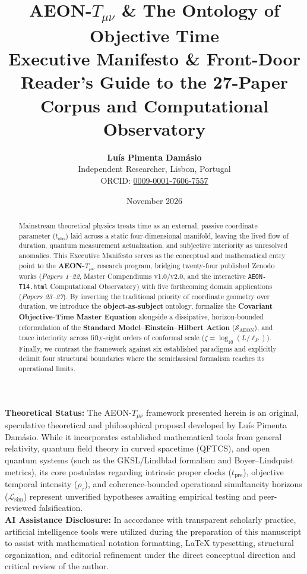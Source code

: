 \documentclass[11pt,a4paper]{article}
\title{\textbf{AEON-$T_{\mu\nu}$ \& The Ontology of Objective Time}\\[0.4em]
\large Executive Manifesto \& Front-Door Reader's Guide to the 27-Paper Corpus and Computational Observatory}
\author{\textbf{Luís Pimenta Damásio}\\
Independent Researcher, Lisbon, Portugal\\
ORCID: \href{https://orcid.org/0009-0001-7606-7557}{0009-0001-7606-7557}}
\date{November 2026}
\begin{document}
\maketitle

\begin{tcolorbox}[colback=gray!6,colframe=gray!50,title=\textbf{Epistemic Status \& AI Collaboration Disclaimer}]
\small
\textbf{Theoretical Status:} The AEON-$T_{\mu\nu}$ framework presented herein is an original, speculative theoretical and philosophical proposal developed by Luís Pimenta Damásio. While it incorporates established mathematical tools from general relativity, quantum field theory in curved spacetime (QFTCS), and open quantum systems (such as the GKSL/Lindblad formalism and Boyer--Lindquist metrics), its core postulates regarding intrinsic proper clocks ($t_{\text{pre}}$), objective temporal intensity ($\rho_\tau$), and coherence-bounded operational simultaneity horizons ($\mathcal{L}_{\text{sim}}$) represent unverified hypotheses awaiting empirical testing and peer-reviewed falsification.\\[0.4em]
\textbf{AI Assistance Disclosure:} In accordance with transparent scholarly practice, artificial intelligence tools were utilized during the preparation of this manuscript to assist with mathematical notation formatting, LaTeX typesetting, structural organization, and editorial refinement under the direct conceptual direction and critical review of the author.
\end{tcolorbox}

\begin{abstract}
\noindent Mainstream theoretical physics treats time as an external, passive coordinate parameter ($t_{\text{obs}}$) laid across a static four-dimensional manifold, leaving the lived flow of duration, quantum measurement actualization, and subjective interiority as unresolved anomalies. This Executive Manifesto serves as the conceptual and mathematical entry point to the \textbf{AEON-$T_{\mu\nu}$} research program, bridging twenty-four published Zenodo works (\textit{Papers 1--22}, Master Compendiums v1.0/v2.0, and the interactive \texttt{AEON-T14.html} Computational Observatory) with five forthcoming domain applications (\textit{Papers 23--27}). By inverting the traditional priority of coordinate geometry over duration, we introduce the \textbf{object-as-subject} ontology, formalize the \textbf{Covariant Objective-Time Master Equation} alongside a dissipative, horizon-bounded reformulation of the \textbf{Standard Model--Einstein--Hilbert Action} ($\mathcal{S}_{\text{AEON}}$), and trace interiority across fifty-eight orders of conformal scale ($\zeta = \log_{10}(L/\ell_P)$). Finally, we contrast the framework against six established paradigms and explicitly delimit four structural boundaries where the semiclassical formalism reaches its operational limits.
\end{abstract}
\end{document}
